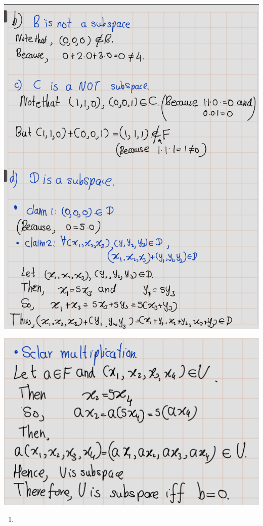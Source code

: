 \documentclass[
]{book}
\providecommand{\tightlist}{%
  \setlength{\itemsep}{0pt}\setlength{\parskip}{0pt}}
\theoremstyle{definition}
\theoremstyle{definition}
\theoremstyle{definition}
\theoremstyle{definition}
\theoremstyle{remark}
\begin{document}
\includegraphics[width=9.12in]{fig/Ex1C/Ex1-2}

\includegraphics[width=14.06in]{fig/Ex1C/Ex1-3}

\begin{enumerate}
\def\labelenumi{\arabic{enumi}.}
\setcounter{enumi}{1}
\tightlist
\item
\end{enumerate}
\end{document}
